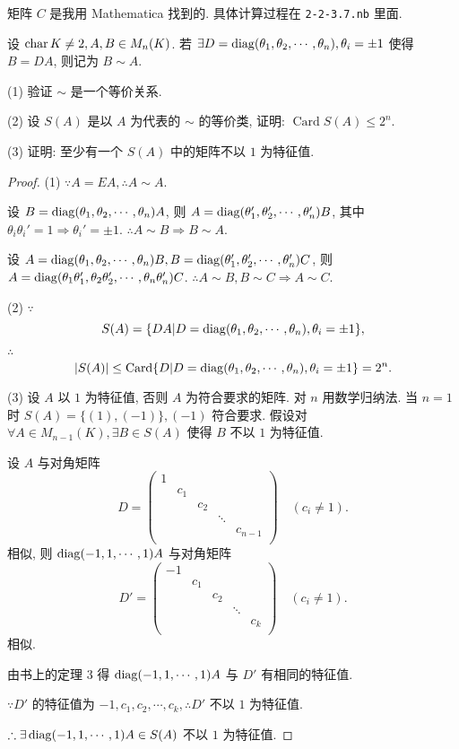 \documentclass[color=black,device=normal,lang=cn,mode=geye]{elegantnote}
\begin{document}
\begin{note}
    矩阵 $C$ 是我用 Mathematica 找到的. 具体计算过程在 \verb|2-2-3.7.nb| 里面.
\end{note}
\begin{exercise}%
    设 $\operatorname{char} K\neq2,A,B\in M_n(K)$. 若 $\exists D=\operatorname{diag} (\theta_1,\theta_2,\cdots,\theta_n),\theta_i=\pm1$ 使得 $B=DA$, 则记为 $B\sim A$.

    (1) 验证 $\sim$ 是一个等价关系.

    (2) 设 $S(A)$ 是以 $A$ 为代表的 $\sim$ 的等价类, 证明: $\operatorname{Card}S(A)\leq2^n$.

    (3) 证明: 至少有一个 $S(A)$ 中的矩阵不以 $1$ 为特征值.
\end{exercise}
\begin{proof}
    (1) $\because A=EA,\therefore A\sim A$.

    设 $B=\operatorname{diag} (\theta_1,\theta_2,\cdots,\theta_n)A$, 则 $A=\operatorname{diag} (\theta_1',\theta_2',\cdots,\theta_n')B$, 其中 $\theta_i\theta_i'=1\Rightarrow\theta_i'=\pm1$. $\therefore A\sim B\Rightarrow B\sim A$.

    设 $A=\operatorname{diag} (\theta_1,\theta_2,\cdots,\theta_n)B,B=\operatorname{diag} (\theta_1',\theta_2',\cdots,\theta_n')C$, 则 $A=\operatorname{diag} (\theta_1\theta_1',\theta_2\theta_2',\cdots,\theta_n\theta_n')C$. $\therefore A\sim B,B\sim C\Rightarrow A\sim C$.

    (2) $\because$
    \[S(A)=\{DA|D=\operatorname{diag} (\theta_1,\theta_2,\cdots,\theta_n),\theta_i=\pm1\},\]

    $\therefore$
    \[|S(A)|\leq\operatorname{Card}\{D|D=\operatorname{diag} (\theta_1,\theta_2,\cdots,\theta_n),\theta_i=\pm1\}=2^n.\]

    (3) 设 $A$ 以 $1$ 为特征值, 否则 $A$ 为符合要求的矩阵. 对 $n$ 用数学归纳法. 当 $n=1$ 时 $S(A)=\{(1),(-1)\},(-1)$ 符合要求. 假设对 $\forall A\in M_{n-1}(K),\exists B\in S(A)$ 使得 $B$ 不以 $1$ 为特征值.
    
    设 $A$ 与对角矩阵
    \[D=\begin{pmatrix}
        1 \\
        & c_1 \\
        && c_2 \\
        &&& \ddots \\
        &&&& c_{n-1} \\
    \end{pmatrix}\quad(c_i\neq 1).\]
    相似, 则 $\operatorname{diag} (-1,1,\cdots,1)A$ 与对角矩阵
    \[D'=\begin{pmatrix}
        -1 \\
        & c_1 \\
        && c_2 \\
        &&& \ddots \\
        &&&& c_k \\
    \end{pmatrix}\quad(c_i\neq 1).\]
    相似.
    
    由书上的定理 3 得 $\operatorname{diag} (-1,1,\cdots,1)A$ 与 $D'$ 有相同的特征值.

    $\because D'$ 的特征值为 $-1,c_1,c_2,\cdots,c_k,\therefore D'$ 不以 $1$ 为特征值.

    $\therefore\exists\operatorname{diag} (-1,1,\cdots,1)A\in S(A)$ 不以 $1$ 为特征值.
\end{proof}
\end{document}

